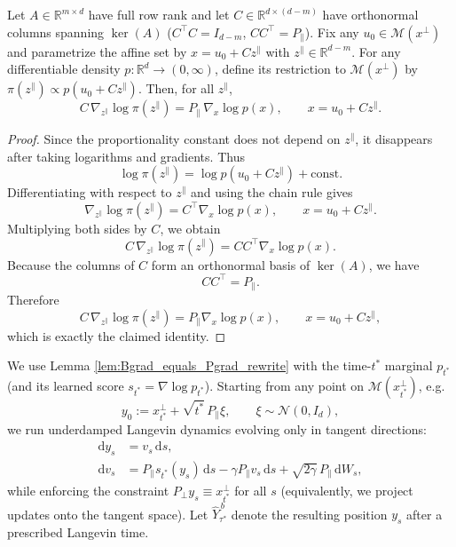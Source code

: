 \documentclass[twoside,11pt]{article}
\newcommand{\R}{\mathbb{R}}
\newcommand{\Nc}{\mathcal{N}}
\newcommand{\dd}{\mathrm{d}}
\newcommand{\Mc}{\mathcal{M}}
\numberwithin{equation}{section}
\begin{document}
\begin{lemma}\label{lem:Bgrad_equals_Pgrad_rewrite}
Let \(A\in\R^{m\times d}\) have full row rank and let \(C\in\R^{d\times(d-m)}\) have orthonormal columns spanning
\(\ker(A)\) (\(C^\top C=I_{d-m}\), \(CC^\top=P_{\parallel}\)). Fix any \(u_0\in\Mc(x^\perp)\) and parametrize the
affine set by \(x=u_0+Cz^{\parallel}\) with \(z^{\parallel}\in\R^{d-m}\). For any differentiable density
\(p:\R^d\to(0,\infty)\), define its restriction to $\Mc(x^\perp) $ by \(\pi(z^{\parallel})\propto p(u_0+Cz^{\parallel})\). Then, for all
\(z^{\parallel}\),
\[
C\,\nabla_{z^{\parallel}}\log \pi(z^{\parallel})
=
P_{\parallel}\,\nabla_x\log p(x),
\qquad x=u_0+Cz^{\parallel}.
\]
\end{lemma}
\begin{proof}
Since the proportionality constant does not depend on \(z^\parallel\), it disappears after taking
logarithms and gradients. Thus
\[
\log \pi(z^\parallel)=\log p(u_0+Cz^\parallel)+\text{const}.
\]
Differentiating with respect to \(z^\parallel\) and using the chain rule gives
\[
\nabla_{z^\parallel}\log \pi(z^\parallel)
=
C^\top \nabla_x \log p(x),
\qquad x=u_0+Cz^\parallel.
\]
Multiplying both sides by \(C\), we obtain
\[
C\,\nabla_{z^\parallel}\log \pi(z^\parallel)
=
CC^\top \nabla_x\log p(x).
\]
Because the columns of \(C\) form an orthonormal basis of \(\ker(A)\), we have
\[
CC^\top=P_\parallel.
\]
Therefore
\[
C\,\nabla_{z^\parallel}\log \pi(z^\parallel)
=
P_\parallel \nabla_x\log p(x),
\qquad x=u_0+Cz^\parallel,
\]
which is exactly the claimed identity.
\end{proof}
We use Lemma \ref{lem:Bgrad_equals_Pgrad_rewrite} with the time-\(t^*\) marginal \(p_{t^*}\) (and its learned score
\(s_{t^*}=\nabla\log p_{t^*}\)). Starting from any point on \(\Mc(x^\perp_{t^*})\), e.g.
\[
y_0 := x^\perp_{t^*} + \sqrt{t^*}\,P_\parallel \xi,\qquad \xi\sim\Nc(0,I_d),
\]
we run underdamped Langevin dynamics evolving only in tangent directions:
\begin{equation}\label{eq:underdamped_langevin_rewrite}
\begin{aligned}
\dd y_s &= v_s\,\dd s,\\
\dd v_s &=
P_{\parallel}s_{t^*}(y_s)\,\dd s
-\gamma P_{\parallel}v_s\,\dd s
+\sqrt{2\gamma}\,P_{\parallel}\,\dd W_s,
\end{aligned}
\end{equation}
while enforcing the constraint \(P_\perp y_s\equiv x^\perp_{t^*}\) for all \(s\) (equivalently, we project updates onto the
tangent space). Let \(\hat Y_{\tau^*}^{\,b}\) denote the resulting position \(y_s\) after a prescribed Langevin time.
\end{document}
